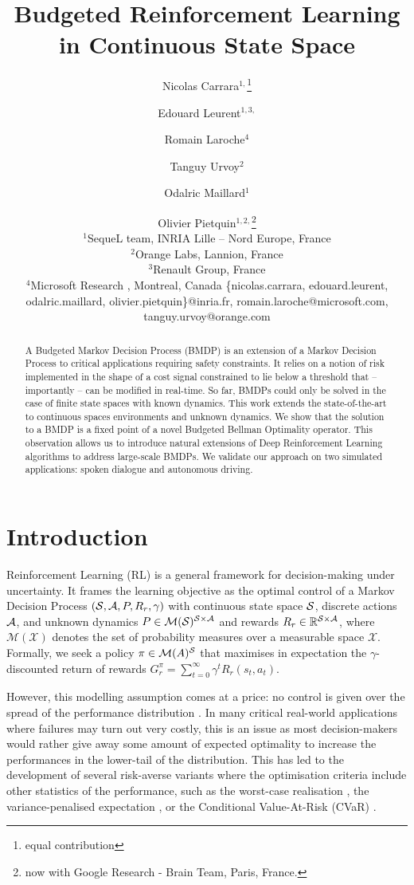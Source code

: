 \documentclass{article}
\title{Budgeted Reinforcement Learning in Continuous State Space}
\author{
Nicolas Carrara$^{1,}$\thanks{equal contribution}\and
Edouard Leurent$^{1,3,}$\footnotemark[1]\and
Romain Laroche$^{4}$\and
Tanguy Urvoy$^{2}$\and
Odalric Maillard$^{1}$\and
Olivier Pietquin$^{1,2,}$\thanks{now with Google Research - Brain Team, Paris, France.}\\
\affiliations $^1$SequeL team, INRIA Lille -- Nord Europe, France\\
$^2$Orange Labs, Lannion, France\\
$^3$Renault Group, France\\
$^4$Microsoft Research , Montreal, Canada
\emails
\{nicolas.carrara, edouard.leurent, odalric.maillard, olivier.pietquin\}@inria.fr,
romain.laroche@microsoft.com, tanguy.urvoy@orange.com
}
\begin{document}
\maketitle
\begin{abstract}
    A Budgeted Markov Decision Process (BMDP) is an extension of a Markov Decision Process to critical applications requiring safety constraints. It relies on a notion of risk implemented in the shape of a cost signal constrained  to lie below a threshold that -- importantly -- can be modified in real-time. So far, BMDPs could only be solved in the case of finite state spaces with known dynamics. This work extends the state-of-the-art to continuous spaces environments and unknown dynamics. We show that the solution to a BMDP is a fixed point of a novel Budgeted Bellman Optimality operator. This observation allows us to introduce natural extensions of Deep Reinforcement Learning algorithms to address large-scale BMDPs. We validate our approach on two simulated applications: spoken dialogue and autonomous driving.
\end{abstract}

\section{Introduction}

Reinforcement Learning (RL) is a general framework for decision-making under uncertainty. It frames the learning objective as the optimal control of a Markov Decision Process  $(\mathcal{S}, \mathcal{A}, P, R_r, \gamma)$ with continuous state space $\mathcal{S}$, discrete actions $\mathcal{A}$, and unknown dynamics $P\in \mathcal{M}(\mathcal{S})^{\mathcal{S} \times \mathcal{A}}$ and rewards $R_r\in\mathbb{R}^{\mathcal{S} \times \mathcal{A}}$, where $\mathcal{M}(\mathcal{X})$ denotes the set of probability measures over a measurable space $\mathcal{X}$. Formally, we seek a policy $\pi\in\mathcal{M}(A)^{\mathcal{S}}$ that maximises in expectation the $\gamma$-discounted return of rewards $G_r^\pi = \sum_{t=0}^\infty \gamma^t R_r(s_t, a_t)$.

However, this modelling assumption comes at a price: no control is given over the spread of the performance distribution \citep{Dann2018}. In many critical real-world applications where failures may turn out very costly, this is an issue as most decision-makers would rather give away some amount of expected optimality to increase the performances in the lower-tail of the distribution. This has led to the development of several risk-averse variants where the optimisation criteria include other statistics of the performance, such as the worst-case realisation \citep{Iyengar2005,Nilim2005,Wiesemann2013}, the variance-penalised expectation \citep{Garcia2015,Tamar2012}, or the Conditional Value-At-Risk (CVaR) \citep{Chow2014,DBLP:journals/corr/ChowGJP15}.
\end{document}

